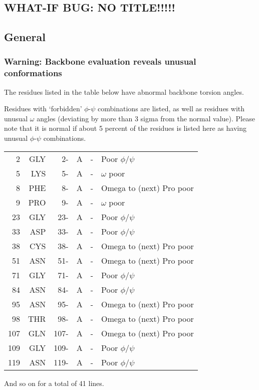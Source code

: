 \documentclass[a4paper]{article}
\def\showsect#1{
  \thesect\gdef\thesect{}
  \thessect\gdef\thessect{}
  \subsubsection{#1}
}
\gdef\thesect{\pagebreak[2]\section{WHAT-IF BUG: NO TITLE!!!!!}}
\gdef\thessect{\subsection{General}}
\begin{document}
\begin{warning}
\showsect{Warning: Backbone evaluation reveals unusual conformations}
The residues listed in the table below have abnormal backbone torsion
angles.
 
Residues with `forbidden' $\phi$-$\psi$ combinations are listed, as well as
residues with unusual $\omega$ angles (deviating by more than 3 sigma from the
normal value). Please note that it is normal if about 5 percent of the
residues is listed here as having unusual $\phi$-$\psi$ combinations.
 
\begin{center}
 
\begin{supertabular}{rr@{ (}r@{) }rl@{ }l}
    2&GLY &   2-&A &-&Poor $\phi$/$\psi$\\
    5&LYS &   5-&A &-&$\omega$ poor\\
    8&PHE &   8-&A &-&Omega to (next) Pro poor\\
    9&PRO &   9-&A &-&$\omega$ poor\\
   23&GLY &  23-&A &-&Poor $\phi$/$\psi$\\
   33&ASP &  33-&A &-&Poor $\phi$/$\psi$\\
   38&CYS &  38-&A &-&Omega to (next) Pro poor\\
   51&ASN &  51-&A &-&Omega to (next) Pro poor\\
   71&GLY &  71-&A &-&Poor $\phi$/$\psi$\\
   84&ASN &  84-&A &-&Poor $\phi$/$\psi$\\
   95&ASN &  95-&A &-&Omega to (next) Pro poor\\
   98&THR &  98-&A &-&Omega to (next) Pro poor\\
  107&GLN & 107-&A &-&Omega to (next) Pro poor\\
  109&GLY & 109-&A &-&Poor $\phi$/$\psi$\\
  119&ASN & 119-&A &-&Poor $\phi$/$\psi$\\
\end{supertabular}\end{center}
And so on for a total of    41 lines.
\end{warning}
\end{document}
